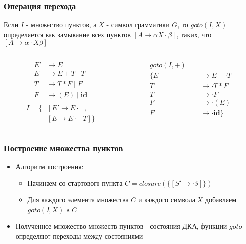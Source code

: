 \documentclass[16pt,pdf,unicode]{beamer}
\begin{document}
\begin{frame}
\frametitle{Операция перехода}
Если $I$ - множество пунктов, а $X$ - символ грамматики $G$, то $goto(I,X)$ определяется как замыкание всех пунктов $[A \rightarrow \alpha X \cdot \beta]$, таких, что $[A \rightarrow \alpha \cdot X \beta]$
\pause
\begin{columns}
\begin{column}{0.5\textwidth}
\begin{align*}
  E' &\rightarrow E \\
  E &\rightarrow E + T \mid T \\
  T &\rightarrow T * F \mid F \\
  F &\rightarrow (E) \mid \textbf{id} \\
\end{align*}
\begin{align*}
I = \{&[E' \rightarrow E \cdot], \\ &[E \rightarrow E \cdot + T] \}
\end{align*}
\end{column}
\begin{column}{0.5\textwidth}
\begin{align*}
goto(I,+) = \\
 \{E &\rightarrow E + \cdot T \\
  T &\rightarrow \cdot T * F \\
  T &\rightarrow \cdot F \\
  F &\rightarrow \cdot (E) \\
  F &\rightarrow \cdot \textbf{id}\}
\end{align*}
\end{column}
\end{columns}
\end{frame}

\begin{frame}
\frametitle{Построение множества пунктов}
\begin{itemize}
  \item Алгоритм построения:
  \begin{itemize}
    \item Начинаем со стартового пункта $C = closure(\{[S' \rightarrow \cdot S]\})$
    \item Для каждого элемента множества $C$ и каждого символа $X$ добавляем $goto(I,X)$ в $C$
  \end{itemize}
  \item Полученное множество множеств пунктов - состояния ДКА, функции $goto$ определяют переходы между состояниями
\end{itemize}
\end{frame}
\end{document}
